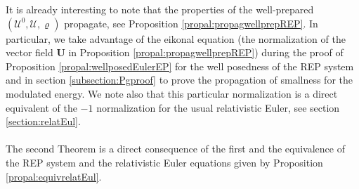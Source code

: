\documentclass[a4paper, 15pt]{article}
\numberwithin{equation}{section}
\begin{document}
It is already interesting to note that the properties of the well-prepared $(\mathscr{U}^0,\mathscr{U},\varrho)$ propagate, see Proposition \ref{propal:propagwellprepREP}. 
In particular, we take advantage of the eikonal equation (the normalization of the vector field $\textbf{U}$ in Proposition \ref{propal:propagwellprepREP}) during the proof of Proposition \ref{propal:wellposedEulerEP} for the well posedness of the REP system and in section \ref{subsection:Pgproof} to prove the propagation of smallness for the modulated energy. We note also that this particular normalization is a direct equivalent of the $-1$ normalization for the usual relativistic Euler, see section \ref{section:relatEul}.  \\ \\
The second Theorem is a direct consequence of the first and the equivalence of the REP system and the relativistic Euler equations given by Proposition \ref{propal:equivrelatEul}.
\end{document}
